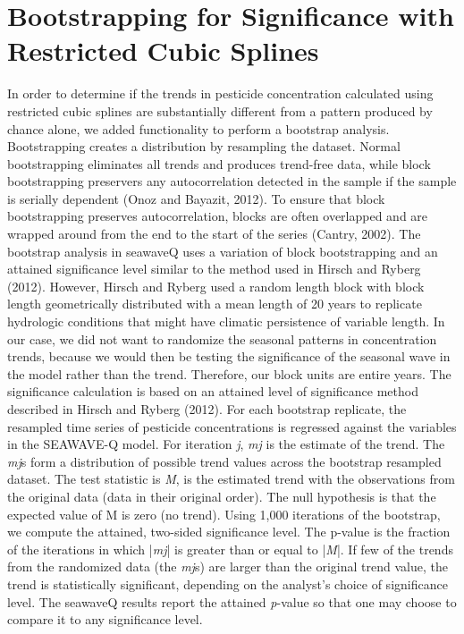 \documentclass[11pt]{article}
\begin{document}
\section{Bootstrapping for Significance with Restricted Cubic Splines}
In order to determine if the trends in pesticide concentration calculated using restricted cubic splines are substantially different from a pattern produced by chance alone, we added functionality to perform a bootstrap analysis. Bootstrapping creates a distribution by resampling the dataset. Normal bootstrapping eliminates all trends and produces trend-free data, while block bootstrapping preservers any autocorrelation detected in the sample if the sample is serially dependent (Onoz and Bayazit, 2012). To ensure that block bootstrapping preserves autocorrelation, blocks are often overlapped and are wrapped around from the end to the start of the series (Cantry, 2002). The bootstrap analysis in seawaveQ uses a variation of block bootstrapping and an attained significance level similar to the method used in Hirsch and Ryberg (2012). However, Hirsch and Ryberg used a random length block with block length geometrically distributed with a mean length of 20 years to replicate hydrologic conditions that might have climatic persistence of variable length. In our case, we did not want to randomize the seasonal patterns in concentration trends, because we would then be testing the significance of the seasonal wave in the model rather than the trend. Therefore, our block units are entire years. The significance calculation is based on an attained level of significance method described in Hirsch and Ryberg (2012). For each bootstrap replicate, the resampled time series of pesticide concentrations is regressed against the variables in the SEAWAVE-Q model. For iteration \textit{j}, \textit{mj} is the estimate of the trend. The \textit{mj}s form a distribution of possible trend values across the bootstrap resampled dataset. The test statistic is \textit{M}, is the estimated trend with the observations from the original data (data in their original order). The null hypothesis is that the expected value of M is zero (no trend). Using 1,000 iterations of the bootstrap, we compute the attained, two-sided significance level. The p-value is the fraction of the iterations in which |\textit{mj}| is greater than or equal to |\textit{M}|. If few of the trends from the randomized data (the \textit{mj}s) are larger than the original trend value, the trend is statistically significant, depending on the analyst’s choice of significance level. The seawaveQ results report the attained \textit{p}-value so that one may choose to compare it to any significance level.
\end{document}
